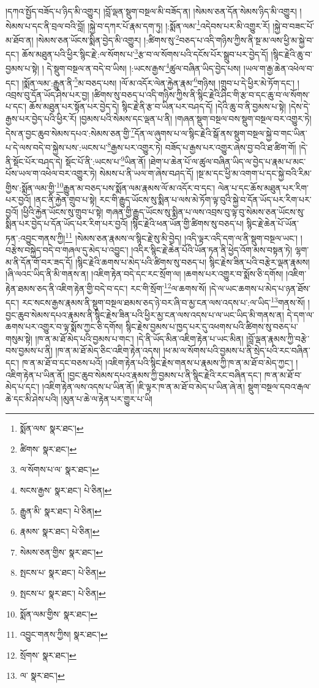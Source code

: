 །དཀའ་སྤྱོད་བཟོད་པ་ཉིད་མི་འགྱུར། །བློ་ལྡན་སྡུག་བསྔལ་མི་བཟོད་ན། །སེམས་ཅན་དོན་སེམས་ཉིད་མི་འགྱུར། །སེམས་པ་དང་ནི་བྲལ་བའི་བློ། །སྐྱེ་བ་དཀར་པོ་རྣམ་དག་ཏུ། །:སྨོན་ལམ་\footnote{སྨོན་ལས་  སྣར་ཐང་། }འདེབས་པར་མི་འགྱུར་རོ། །སྐྱེ་བ་བཟང་པོ་མ་ཐོབ་ན། །སེམས་ཅན་ཡོངས་སྨིན་བྱེད་མི་འགྱུར། །:ཚིགས་སུ་\footnote{ཚིགས་  སྣར་ཐང་། }བཅད་པ་འདི་གཉིས་ཀྱིས་ནི་སྔ་མ་ལས་ཕྱི་མ་སྐྱེ་བ་དང་། ཆོས་མཐུན་པའི་ཕྱིར་སྙིང་རྗེ་:ལ་སོགས་པ་\footnote{ལ་སོགས་པ་ལ་  སྣར་ཐང་། }རྩ་བ་ལ་སོགས་པའི་དངོས་པོར་སྒྲུབ་པར་བྱེད་དོ། །སྙིང་རྗེའི་ཆུ་བ་བྱམས་པ་སྟེ། །
དེ་སྡུག་བསྔལ་ན་བདེ་བ་ཡིས། །:ཡངས་རྒྱས་\footnote{སངས་རྒྱས་  སྣར་ཐང་།  པེ་ཅིན། }ཚུལ་བཞིན་ཡིད་བྱེད་པས། །ཡལ་ག་རྒྱ་ཆེན་འཕེལ་བ་དང་། །སྨོན་ལམ་:རྒྱུན་ནི་\footnote{རྒྱུན་མི་  སྣར་ཐང་།  པེ་ཅིན། }མ་བཅད་པས། །ལོ་མ་འདོར་ལེན་རྐྱེན་རྣམ་\footnote{རྣམས་  སྣར་ཐང་།  པེ་ཅིན། }གཉིས། །གྲུབ་པ་དེ་ཕྱིར་མེ་ཏོག་དང་། །འབྲས་བུ་དོན་ཡོད་ཤེས་པར་བྱ། །ཚིགས་སུ་བཅད་པ་འདི་གཉིས་ཀྱིས་ནི་སྙིང་རྗེའི་ཤིང་གི་རྩ་བ་དང་ཆུ་བ་ལ་སོགས་པ་དང་། ཆོས་མཐུན་པར་སྟོན་པར་བྱེད་དེ། སྙིང་རྗེ་ནི་རྩ་བ་ཡིན་པར་བཤད་དོ། །དེའི་ཆུ་བ་ནི་བྱམས་པ་སྟེ། །དེས་དེ་རྒྱས་པར་བྱེད་པའི་ཕྱིར་རོ། །བྱམས་པའི་སེམས་དང་ལྡན་པ་ནི། །གཞན་སྡུག་བསྔལ་བས་སྡུག་བསྔལ་བར་འགྱུར་ཏེ། དེས་ན་བྱང་ཆུབ་སེམས་དཔའ་:སེམས་ཅན་གྱི་\footnote{སེམས་ཅན་གྱིས་  སྣར་ཐང་། }དོན་ལ་ཞུགས་པ་ལ་སྙིང་རྗེའི་སྒོ་ནས་སྡུག་བསྔལ་སྐྱེ་བ་གང་ཡིན་པ་དེ་ལས་བདེ་བ་སྐྱེས་པས་:ཡངས་པ་\footnote{སྤངས་པ་  སྣར་ཐང་།  པེ་ཅིན། }རྒྱས་པར་འགྱུར་ཏེ། བཟོད་པ་རྒྱས་པར་འགྱུར་ཞེས་བྱ་བའི་ཐ་ཚིག་གོ། །དེ་ནི་སྡོང་པོར་བཤད་དེ། སྡོང་པོ་ནི་:ཡངས་པ་\footnote{སྤངས་པ་  སྣར་ཐང་།  པེ་ཅིན། }ཡིན་ནོ། །ཐེག་པ་ཆེན་པོ་ལ་ཚུལ་བཞིན་ཡིད་ལ་བྱེད་པ་རྣམ་པ་མང་པོས་ཡལ་ག་འཕེལ་བར་འགྱུར་ཏེ། སེམས་པ་ནི་ཡལ་ག་ཞེས་བཤད་དོ། །སྔ་མ་དང་ཕྱི་མ་འགག་པ་དང་སྐྱེ་བའི་རིམ་གྱིས་:སྨོན་ལམ་གྱི་\footnote{སྨོན་ལམ་གྱིས་  སྣར་ཐང་། }རྒྱུན་མ་བཅད་པས་སྨོན་ལམ་རྣམས་ལོ་མ་འདོར་བ་དང་། ལེན་པ་དང་ཆོས་མཐུན་པར་རིག་པར་བྱའོ། །ནང་ནི་རྐྱེན་གྲུབ་པ་སྟེ། རང་གི་རྒྱུད་ཡོངས་སུ་སྨིན་པ་ལས་མེ་ཏོག་ལྟ་བུའི་སྐྱེ་བ་དོན་ཡོད་པར་རིག་པར་བྱའོ། །ཕྱིའི་རྐྱེན་ཡོངས་སུ་གྲུབ་པ་སྟེ། གཞན་གྱི་རྒྱུད་ཡོངས་སུ་སྨིན་པ་ལས་འབྲས་བུ་ལྟ་བུ་སེམས་ཅན་ཡོངས་སུ་སྨིན་པར་བྱེད་པ་དོན་ཡོད་པར་རིག་པར་བྱའོ། །སྙིང་རྗེའི་ཕན་ཡོན་གྱི་ཚིགས་སུ་བཅད་པ། སྙིང་རྗེ་ཆེན་པོ་ཡོན་ཏན་:འབྱུང་གནས་ཀྱི།\footnote{འབྱུང་གནས་ཀྱིས།  སྣར་ཐང་། } །སེམས་ཅན་རྣམས་ལ་སྙིང་རྗེ་སུ་མི་བྱེད། །འདི་ལྟར་འདི་དག་ལ་ནི་སྡུག་བསྔལ་ཡང་། །བརྩེས་བསྐྱེད་བདེ་བ་གཞལ་དུ་མེད་པ་འབྱུང་། །འདིར་སྙིང་རྗེ་ཆེན་པོའི་ཡོན་ཏན་ནི་ཕྱེད་འོག་མས་བསྟན་ཏེ། ལྷག་མ་ནི་དོན་གོ་བར་ཟད་དོ། །སྙིང་རྗེའི་ཆགས་པ་མེད་པའི་ཚིགས་སུ་བཅད་པ། སྙིང་རྗེས་ཟིན་པའི་བརྩེར་ལྡན་རྣམས། །ཞི་ལའང་ཡིད་ནི་མི་གནས་ན། །འཇིག་རྟེན་བདེ་དང་རང་སྲོག་ལ། །ཆགས་པར་འགྱུར་བ་སྨོས་ཅི་དགོས། །འཇིག་རྟེན་ཐམས་ཅད་ནི་འཇིག་རྟེན་གྱི་བདེ་བ་དང་། རང་གི་སྲོག་\footnote{སྲོགས་  སྣར་ཐང་། }ལ་ཆགས་སོ། །དེ་ལ་ཡང་ཆགས་པ་མེད་པ་ཉན་ཐོས་དང་། རང་སངས་རྒྱས་རྣམས་ནི་སྡུག་བསྔལ་ཐམས་ཅད་ཉེ་བར་ཞི་བ་མྱ་ངན་ལས་འདས་པ་:ལ་ཡིད་\footnote{ལ་  སྣར་ཐང་། }གནས་སོ། །བྱང་ཆུབ་སེམས་དཔའ་རྣམས་ནི་སྙིང་རྗེས་ཟིན་པའི་ཕྱིར་མྱ་ངན་ལས་འདས་པ་ལ་ཡང་ཡིད་མི་གནས་ན། དེ་དག་ལ་ཆགས་པར་འགྱུར་བ་ལྟ་སྨོས་ཀྱང་ཅི་དགོས། སྙིང་རྗེས་བྱམས་པ་ཁྱད་པར་དུ་འཕགས་པའི་ཚིགས་སུ་བཅད་པ་གསུམ་སྟེ། །ཁ་ན་མ་ཐོ་མེད་པའི་བྱམས་པ་གང་། །དེ་ནི་ཡོད་མིན་འཇིག་རྟེན་པ་ཡང་མིན། །བློ་ལྡན་རྣམས་ཀྱི་བརྩེ་བས་བྱམས་པ་ནི། །ཁ་ན་མ་ཐོ་མེད་ཅིང་འཇིག་རྟེན་འདས། །ཕ་མ་ལ་སོགས་པའི་བྱམས་པ་ནི་སྲེད་པའི་རང་བཞིན་དང་། ཁ་ན་མ་ཐོ་བ་དང་བཅས་པའོ། །འཇིག་རྟེན་པའི་སྙིང་རྗེས་གནས་པ་རྣམས་ཀྱི་ཁ་ན་མ་ཐོ་བ་མེད་ཀྱང་། །འཇིག་རྟེན་པ་ཡིན་ནོ། །བྱང་ཆུབ་སེམས་དཔའ་རྣམས་ཀྱི་བྱམས་པ་ནི་སྙིང་རྗེའི་རང་བཞིན་དང་། ཁ་ན་མ་ཐོ་བ་མེད་པ་དང་། །འཇིག་རྟེན་ལས་འདས་པ་ཡིན་ནོ། །ཇི་ལྟར་ཁ་ན་མ་ཐོ་བ་མེད་པ་ཡིན་ཞེ་ན། སྡུག་བསྔལ་དབའ་རྒལ་ཆེ་དང་མི་ཤེས་པའི། །མུན་པ་ཆེ་ལ་རྟེན་པར་གྱུར་པ་ཡི། 